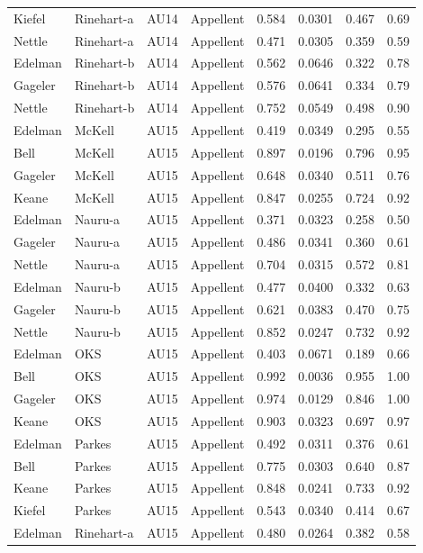 \documentclass{monashthesis}
\begin{document}
\begin{center}
\begin{longtable}{llllllll}
Kiefel & Rinehart-a & AU14 & Appellent & 0.584 & 0.0301 & 0.467 & 0.69 \\
Nettle & Rinehart-a & AU14 & Appellent & 0.471 & 0.0305 & 0.359 & 0.59 \\
Edelman & Rinehart-b & AU14 & Appellent & 0.562 & 0.0646 & 0.322 & 0.78 \\
Gageler & Rinehart-b & AU14 & Appellent & 0.576 & 0.0641 & 0.334 & 0.79 \\
Nettle & Rinehart-b & AU14 & Appellent & 0.752 & 0.0549 & 0.498 & 0.90 \\
Edelman & McKell & AU15 & Appellent & 0.419 & 0.0349 & 0.295 & 0.55 \\
Bell & McKell & AU15 & Appellent & 0.897 & 0.0196 & 0.796 & 0.95 \\
Gageler & McKell & AU15 & Appellent & 0.648 & 0.0340 & 0.511 & 0.76 \\
Keane & McKell & AU15 & Appellent & 0.847 & 0.0255 & 0.724 & 0.92 \\
Edelman & Nauru-a & AU15 & Appellent & 0.371 & 0.0323 & 0.258 & 0.50 \\
Gageler & Nauru-a & AU15 & Appellent & 0.486 & 0.0341 & 0.360 & 0.61 \\
Nettle & Nauru-a & AU15 & Appellent & 0.704 & 0.0315 & 0.572 & 0.81 \\
Edelman & Nauru-b & AU15 & Appellent & 0.477 & 0.0400 & 0.332 & 0.63 \\
Gageler & Nauru-b & AU15 & Appellent & 0.621 & 0.0383 & 0.470 & 0.75 \\
Nettle & Nauru-b & AU15 & Appellent & 0.852 & 0.0247 & 0.732 & 0.92 \\
Edelman & OKS & AU15 & Appellent & 0.403 & 0.0671 & 0.189 & 0.66 \\
Bell & OKS & AU15 & Appellent & 0.992 & 0.0036 & 0.955 & 1.00 \\
Gageler & OKS & AU15 & Appellent & 0.974 & 0.0129 & 0.846 & 1.00 \\
Keane & OKS & AU15 & Appellent & 0.903 & 0.0323 & 0.697 & 0.97 \\
Edelman & Parkes & AU15 & Appellent & 0.492 & 0.0311 & 0.376 & 0.61 \\
Bell & Parkes & AU15 & Appellent & 0.775 & 0.0303 & 0.640 & 0.87 \\
Keane & Parkes & AU15 & Appellent & 0.848 & 0.0241 & 0.733 & 0.92 \\
Kiefel & Parkes & AU15 & Appellent & 0.543 & 0.0340 & 0.414 & 0.67 \\
Edelman & Rinehart-a & AU15 & Appellent & 0.480 & 0.0264 & 0.382 & 0.58 \\

\end{longtable}
\end{center}
\end{document}
